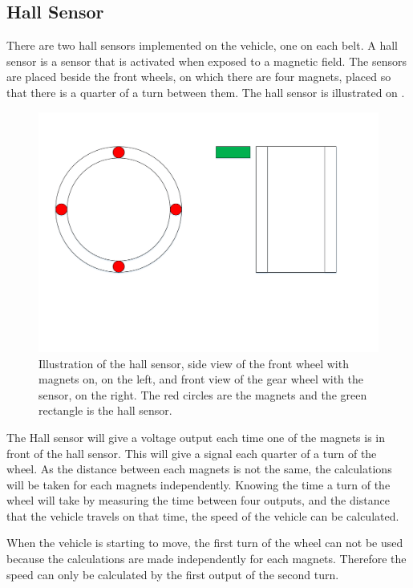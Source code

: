 \subsection{Hall Sensor}

There are two hall sensors implemented on the vehicle, one on each belt. A hall sensor is a sensor that is activated when exposed to a magnetic field. The sensors are placed beside the front wheels, on which there are four magnets, placed so that there is a quarter of a turn between them. The hall sensor is illustrated on .

 \begin{figure}[H]
	\centering
	\includegraphics[scale=0.5]{figures/HallSensorSide_Forward_view.pdf}
	\caption{Illustration of the hall sensor, side view of the front wheel with magnets on, on the left, and front view of the gear wheel with the sensor, on the right. The red circles are the magnets and the green rectangle is the hall sensor.}
	\label{HallSensor}
\end{figure}

The Hall sensor will give a voltage output each time one of the magnets is in front of the hall sensor. This will give a signal each quarter of a turn of the wheel. As the distance between each magnets is not the same, the calculations will be taken for each magnets independently.
Knowing the time a turn of the wheel will take by measuring the time between four outputs, and the distance that the vehicle travels on that time, the speed of the vehicle can be calculated.

When the vehicle is starting to move, the first turn of the wheel can not be used because the calculations are made independently for each magnets. Therefore the speed can only be calculated by the first output of the second turn.